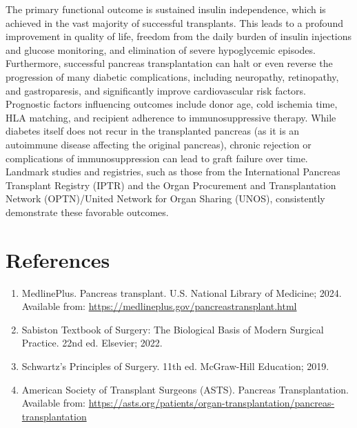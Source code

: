 The primary functional outcome is sustained insulin independence, which is achieved in the vast majority of successful transplants. This leads to a profound improvement in quality of life, freedom from the daily burden of insulin injections and glucose monitoring, and elimination of severe hypoglycemic episodes. Furthermore, successful pancreas transplantation can halt or even reverse the progression of many diabetic complications, including neuropathy, retinopathy, and gastroparesis, and significantly improve cardiovascular risk factors. Prognostic factors influencing outcomes include donor age, cold ischemia time, HLA matching, and recipient adherence to immunosuppressive therapy. While diabetes itself does not recur in the transplanted pancreas (as it is an autoimmune disease affecting the original pancreas), chronic rejection or complications of immunosuppression can lead to graft failure over time. Landmark studies and registries, such as those from the International Pancreas Transplant Registry (IPTR) and the Organ Procurement and Transplantation Network (OPTN)/United Network for Organ Sharing (UNOS), consistently demonstrate these favorable outcomes.

\section*{References}
\begin{enumerate}
  \item MedlinePlus. Pancreas transplant. U.S. National Library of Medicine; 2024. Available from: \url{https://medlineplus.gov/pancreastransplant.html}
  \item Sabiston Textbook of Surgery: The Biological Basis of Modern Surgical Practice. 22nd ed. Elsevier; 2022.
  \item Schwartz's Principles of Surgery. 11th ed. McGraw-Hill Education; 2019.
  \item American Society of Transplant Surgeons (ASTS). Pancreas Transplantation. Available from: \url{https://asts.org/patients/organ-transplantation/pancreas-transplantation}
\end{enumerate}

\clearpage
